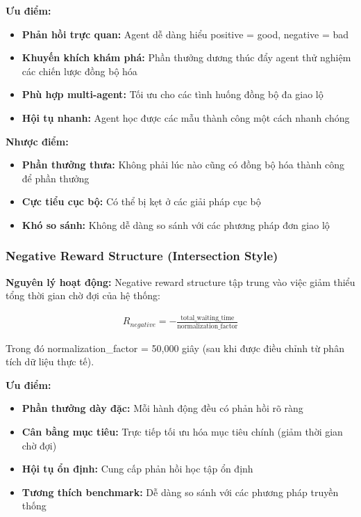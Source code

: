 \textbf{Ưu điểm:}
\begin{itemize}
    \item \textbf{Phản hồi trực quan:} Agent dễ dàng hiểu positive = good, negative
        = bad

    \item \textbf{Khuyến khích khám phá:} Phần thưởng dương thúc đẩy agent thử
        nghiệm các chiến lược đồng bộ hóa

    \item \textbf{Phù hợp multi-agent:} Tối ưu cho các tình huống đồng bộ đa giao lộ

    \item \textbf{Hội tụ nhanh:} Agent học được các mẫu thành công một
        cách nhanh chóng
\end{itemize}

\textbf{Nhược điểm:}
\begin{itemize}
    \item \textbf{Phần thưởng thưa:} Không phải lúc nào cũng có đồng bộ hóa thành công để phần thưởng

    \item \textbf{Cực tiểu cục bộ:} Có thể bị kẹt ở các giải pháp cục bộ

    \item \textbf{Khó so sánh:} Không dễ dàng so sánh với các phương pháp đơn giao lộ
\end{itemize}

\subsubsection{Negative Reward Structure (Intersection Style)}

\textbf{Nguyên lý hoạt động:} Negative reward structure tập trung vào việc giảm
thiểu tổng thời gian chờ đợi của hệ thống:

\begin{align}
    R_{negative} = -\frac{\text{total\_waiting\_time}}{\text{normalization\_factor}}
\end{align}

Trong đó normalization\_factor = 50,000 giây (sau khi được điều chỉnh từ phân
tích dữ liệu thực tế).

\textbf{Ưu điểm:}
\begin{itemize}
    \item \textbf{Phần thưởng dày đặc:} Mỗi hành động đều có phản hồi rõ ràng

    \item \textbf{Cân bằng mục tiêu:} Trực tiếp tối ưu hóa mục tiêu chính (giảm
        thời gian chờ đợi)

    \item \textbf{Hội tụ ổn định:} Cung cấp phản hồi học tập ổn định

    \item \textbf{Tương thích benchmark:} Dễ dàng so sánh với các phương pháp
        truyền thống
\end{itemize}

